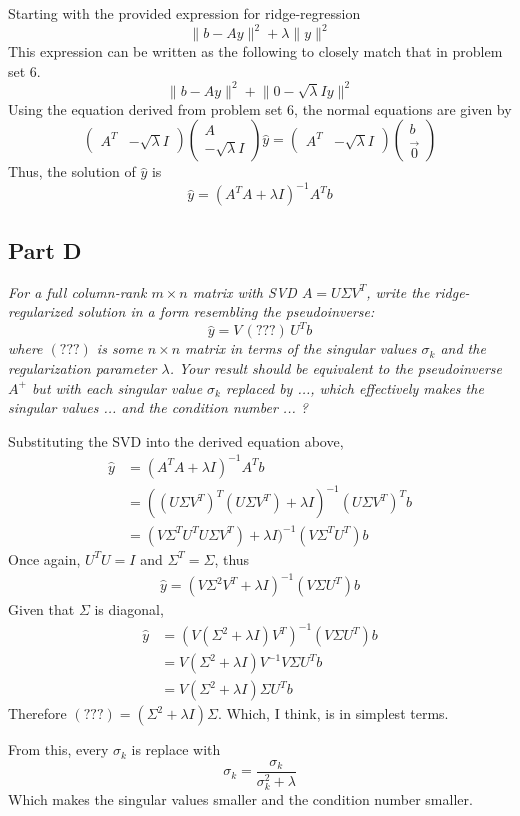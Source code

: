 \documentclass{article}
\begin{document}
\bigbreak

Starting with the provided expression for ridge-regression
$$ \lVert b - Ay \rVert^2 + \lambda \lVert y \rVert^2 $$
This expression can be written as the following to closely match that in
problem set 6.
$$ \lVert b - Ay \rVert^2 + \lVert 0 - \sqrt{\lambda} I y \rVert^2 $$
Using the equation derived from problem set 6, the normal equations are given
by
$$ \begin{pmatrix}
  A^T & -\sqrt{\lambda} I
\end{pmatrix} \begin{pmatrix}
  A \\
  -\sqrt{\lambda} I
\end{pmatrix} \hat{y} = \begin{pmatrix}
  A^T & -\sqrt{\lambda} I
\end{pmatrix} \begin{pmatrix}
  b \\
  \vec{0}
\end{pmatrix} $$
Thus, the solution of $\hat{y}$ is
$$ \hat{y} = (A^T A + \lambda I)^{-1} A^T b $$

\subsection*{Part D}

\textit{For a full column-rank $m\times n$ matrix with SVD $A = U \Sigma
V^T$, write the ridge-regularized solution in a form resembling the
pseudoinverse:}
$$ \hat{y} = V \, (???) \, U^T b $$
\textit{where $(???)$ is some $n\times n$ matrix in terms of the singular
values $\sigma_k$ and the regularization parameter $\lambda$. Your result
should be equivalent to the pseudoinverse $A^+$ but with each singular
value $\sigma_k$ replaced by ..., which effectively makes the
singular values ... and the condition number ... ?}

\bigbreak

Substituting the SVD into the derived equation above,
\begin{align*}
  \hat{y} &= (A^T A + \lambda I)^{-1} A^T b \\
  &= ((U \Sigma V^T)^T(U \Sigma V^T) + \lambda I)^{-1} (U \Sigma V^T)^T b \\
  &= (V \Sigma^T U^T U \Sigma V^T) + \lambda I)^{-1} (V \Sigma^T U^T) b
\end{align*}
Once again, $U^T U = I$ and $\Sigma^T = \Sigma$, thus
\begin{align*}
  \hat{y} = (V \Sigma^2 V^T + \lambda I)^{-1} (V \Sigma U^T) b
\end{align*}
Given that $\Sigma$ is diagonal,
\begin{align*}
  \hat{y} &= (V (\Sigma^2 + \lambda I) V^T)^{-1} (V \Sigma U^T) b \\
  &= V (\Sigma^2 + \lambda I) V^{-1} V \Sigma U^T b \\
  &= V (\Sigma^2 + \lambda I) \Sigma U^T b
\end{align*}
Therefore $(???) = (\Sigma^2 + \lambda I) \Sigma$. Which, I think, is in
simplest terms.

From this, every $\sigma_k$ is replace with
$$ \sigma_k = \frac{\sigma_k}{\sigma_k^2 + \lambda} $$
Which makes the singular values smaller and the condition number smaller.
\end{document}
